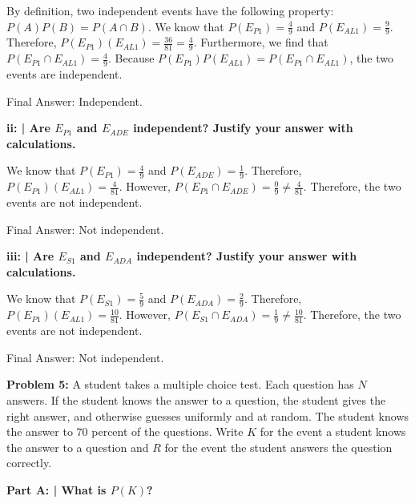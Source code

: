 \documentclass{article}
\begin{document}
 By definition, two independent events have the following property: $P(A)P(B) = P(A \cap B)$. We know that $P(E_{P1}) = \frac{4}{9}$ and $P(E_{AL1}) = \frac{9}{9}.$ Therefore, $P(E_{P1})(E_{AL1}) = \frac{36}{81} = \frac{4}{9}$. Furthermore, we find that $P({E_{P1}} \cap {E_{AL1}}) = \frac{4}{9}$. Because $P({E_{P1}})P({E_{AL1}}) = P({E_{P1}} \cap {E_{AL1}})$, the two events are independent. \newline
 
 Final Answer: Independent.\newline
 
 \textbf{ii: | Are $E_{P1}$ and $E_{ADE}$ independent? Justify your answer with calculations.}\newline
 
 We know that $P(E_{P1}) = \frac{4}{9}$ and $P(E_{ADE}) = \frac{1}{9}.$ Therefore, $P(E_{P1})(E_{AL1}) = \frac{4}{81}$. However, $P({E_{P1}} \cap {E_{ADE}}) = \frac{0}{9} \neq \frac{4}{81}$. Therefore, the two events are not independent. \newline
 
 Final Answer: Not independent.\newline
 
 \textbf{iii: | Are $E_{S1}$ and $E_{ADA}$ independent? Justify your answer with calculations.}\newline
 
 We know that $P(E_{S1}) = \frac{5}{9}$ and $P(E_{ADA}) = \frac{2}{9}.$ Therefore, $P(E_{P1})(E_{AL1}) = \frac{10}{81}$. However, $P({E_{S1}} \cap {E_{ADA}}) = \frac{1}{9} \neq \frac{10}{81}$. Therefore, the two events are not independent. \newline
  
 Final Answer: Not independent.\newline
 
 \newpage
 
 \begin{center}
     \Large\textbf{Problem 5:} A student takes a multiple choice test. Each question has $N$ answers. If the student knows the answer to a question, the student gives the right answer, and otherwise guesses uniformly and at random. The student knows the answer to $70$ percent of the questions. Write $K$ for the event a student knows the answer to a question and $R$ for the event the student answers the question correctly.\par
 \end{center}
 
 \textbf{Part A: | What is $P(K)$?}\newline
 
\end{document}
